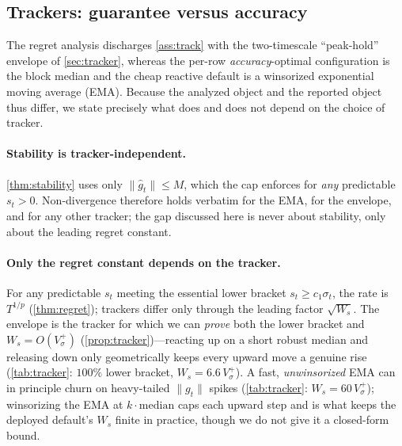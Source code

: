 \documentclass{article}
\newcommand{\norm}[1]{\lVert #1 \rVert}
\newcommand{\gt}{g_t}
\begin{document}
\subsection{Trackers: guarantee versus accuracy}
\label{app:tracker}

The regret analysis discharges \cref{ass:track} with the two-timescale ``peak-hold''
envelope of \cref{sec:tracker}, whereas the per-row \emph{accuracy}-optimal configuration is
the block median and the cheap reactive default is a winsorized exponential moving average
(EMA). Because the analyzed object and the reported object thus differ, we state precisely
what does and does not depend on the choice of tracker.

\paragraph{Stability is tracker-independent.} \cref{thm:stability} uses only
$\norm{\hat g_t}\le M$, which the cap enforces for \emph{any} predictable $s_t>0$.
Non-divergence therefore holds verbatim for the EMA, for the envelope, and for any
other tracker; the gap discussed here is never about stability, only about the leading
regret constant.

\paragraph{Only the regret constant depends on the tracker.} For any predictable $s_t$
meeting the essential lower bracket $s_t\ge c_1\sigma_t$, the rate is $T^{1/p}$
(\cref{thm:regret}); trackers differ only through the leading factor $\sqrt{W_s}$. The
envelope is the tracker for which we can \emph{prove} both the lower bracket and
$W_s=O(V_\sigma^+)$ (\cref{prop:tracker})---reacting up
on a short robust median and releasing down only geometrically keeps every upward move a
genuine rise (\cref{tab:tracker}: $100\%$ lower bracket, $W_s=6.6\,V_\sigma^+$). A fast,
\emph{unwinsorized} EMA can in principle churn on heavy-tailed $\norm{\gt}$ spikes
(\cref{tab:tracker}: $W_s=60\,V_\sigma^+$); winsorizing the EMA at $k\cdot\mathrm{median}$
caps each upward step and is what keeps the deployed default's $W_s$ finite in practice,
though we do not give it a closed-form bound.
\end{document}

